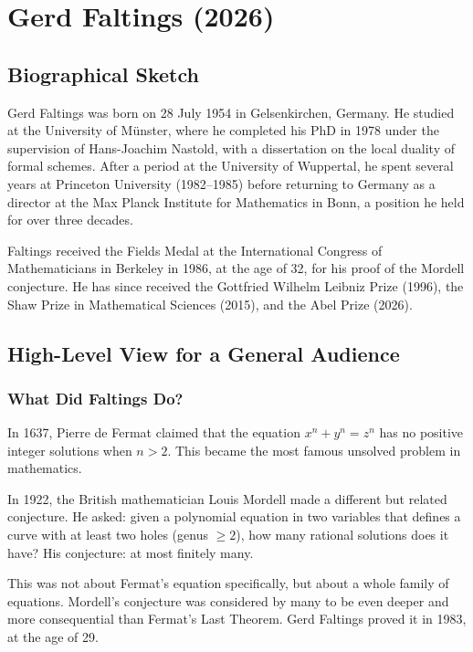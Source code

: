 \chapter{Gerd Faltings (2026)}

\section{Biographical Sketch}



Gerd Faltings was born on 28 July 1954 in Gelsenkirchen, Germany. He studied at the University of M\"unster, where he completed his PhD in 1978 under the supervision of Hans-Joachim Nastold, with a dissertation on the local duality of formal schemes. After a period at the University of Wuppertal, he spent several years at Princeton University (1982--1985) before returning to Germany as a director at the Max Planck Institute for Mathematics in Bonn, a position he held for over three decades.

Faltings received the Fields Medal at the International Congress of Mathematicians in Berkeley in 1986, at the age of 32, for his proof of the Mordell conjecture. He has since received the Gottfried Wilhelm Leibniz Prize (1996), the Shaw Prize in Mathematical Sciences (2015), and the Abel Prize (2026).

\section{High-Level View for a General Audience}

\subsection{What Did Faltings Do?}

In 1637, Pierre de Fermat claimed that the equation $x^n + y^n = z^n$ has no positive integer solutions when $n > 2$. This became the most famous unsolved problem in mathematics.

In 1922, the British mathematician Louis Mordell made a different but related conjecture. He asked: given a polynomial equation in two variables that defines a curve with at least two holes (genus $\geq 2$), how many rational solutions does it have? His conjecture: at most finitely many.

This was not about Fermat's equation specifically, but about a whole family of equations. Mordell's conjecture was considered by many to be even deeper and more consequential than Fermat's Last Theorem. Gerd Faltings proved it in 1983, at the age of 29.

